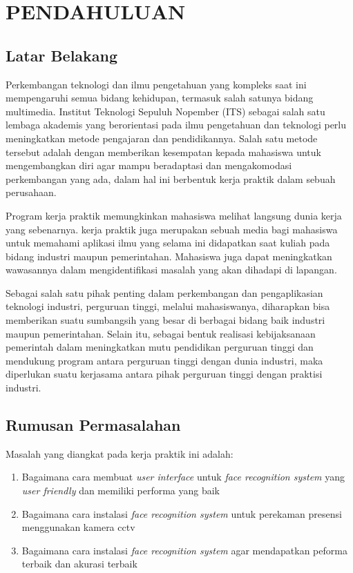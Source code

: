 \chapter{PENDAHULUAN}


\section{Latar Belakang}

  Perkembangan teknologi dan ilmu pengetahuan yang kompleks saat ini mempengaruhi semua bidang kehidupan, termasuk salah satunya bidang multimedia. Institut Teknologi Sepuluh Nopember (ITS) sebagai salah satu lembaga akademis yang berorientasi pada ilmu pengetahuan dan teknologi perlu meningkatkan metode pengajaran dan pendidikannya. Salah satu metode tersebut adalah dengan memberikan kesempatan kepada mahasiswa untuk mengembangkan diri agar mampu beradaptasi dan mengakomodasi perkembangan yang ada, dalam hal ini berbentuk kerja praktik dalam sebuah perusahaan.
  
  Program kerja praktik memungkinkan mahasiswa melihat langsung dunia kerja yang sebenarnya. kerja praktik juga merupakan sebuah media bagi mahasiswa untuk memahami aplikasi ilmu yang selama ini didapatkan saat kuliah pada bidang industri maupun pemerintahan. Mahasiswa juga dapat meningkatkan wawasannya dalam mengidentifikasi masalah yang akan dihadapi di lapangan.

  
  Sebagai salah satu pihak penting dalam perkembangan dan pengaplikasian teknologi industri, perguruan tinggi, melalui mahasiswanya, diharapkan bisa memberikan suatu sumbangsih yang besar di berbagai bidang baik industri maupun pemerintahan. Selain itu, sebagai bentuk realisasi kebijaksanaan pemerintah dalam meningkatkan mutu pendidikan perguruan tinggi dan mendukung program  antara perguruan tinggi dengan dunia industri, maka diperlukan suatu kerjasama antara pihak perguruan tinggi dengan praktisi industri.


\section{Rumusan Permasalahan}

Masalah yang diangkat pada kerja praktik ini adalah:

\begin{enumerate}[nolistsep]

  \item Bagaimana cara membuat \textit{user interface} untuk \textit{face recognition system} yang \textit{user friendly} dan memiliki performa yang baik
  
  \item Bagaimana cara instalasi \textit{face recognition system} untuk perekaman presensi menggunakan kamera cctv

  \item Bagaimana cara instalasi \textit{face recognition system} agar mendapatkan peforma terbaik dan akurasi terbaik

\end{enumerate}

